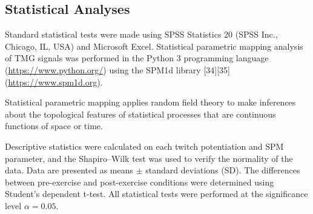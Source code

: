 \documentclass[utf8]{style/FrontiersinHarvard}
\begin{document}
\subsection{Statistical Analyses}
Standard statistical tests were made using SPSS Statistics 20 (SPSS Inc., Chicago, IL, USA) and Microsoft Excel.
Statistical parametric mapping analysis of TMG signals was performed in the Python 3 programming language (\url{https://www.python.org/})
using the SPM1d library [34][35] (\url{https://www.spm1d.org}).

Statistical parametric mapping applies random field theory to make inferences about the topological features of statistical processes that are continuous functions of space or time. 

Descriptive statistics were calculated on each twitch potentiation and SPM parameter, and the Shapiro–Wilk test was used to verify the normality of the data.
Data are presented as means $ \pm $ standard deviations (SD).
The differences between pre-exercise and post-exercise conditions were determined using Student’s dependent t-test.
All statistical tests were performed at the significance level $ \alpha = 0.05 $.
\end{document}
